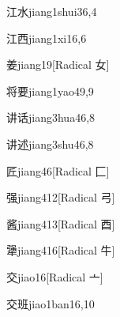 \begin{entry}{江水}{jiang1shui3}{6,4}
\end{entry}

\begin{entry}{江西}{jiang1xi1}{6,6}
\end{entry}

\begin{entry}{姜}{jiang1}{9}[Radical 女]
\end{entry}

\begin{entry}{将要}{jiang1yao4}{9,9}
\end{entry}

\begin{entry}{讲话}{jiang3hua4}{6,8}
\end{entry}

\begin{entry}{讲述}{jiang3shu4}{6,8}
\end{entry}

\begin{entry}{匠}{jiang4}{6}[Radical 匚]
\end{entry}

\begin{entry}{强}{jiang4}{12}[Radical 弓]
\end{entry}

\begin{entry}{酱}{jiang4}{13}[Radical 酉]
\end{entry}

\begin{entry}{犟}{jiang4}{16}[Radical 牛]
\end{entry}

\begin{entry}{交}{jiao1}{6}[Radical 亠]
\end{entry}

\begin{entry}{交班}{jiao1ban1}{6,10}
\end{entry}

